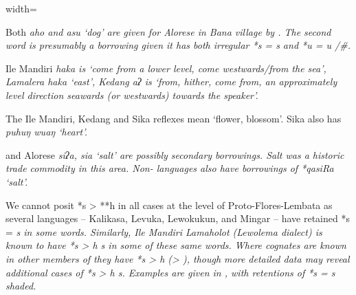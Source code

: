 \begin{table}
\begin{adjustbox}{width=\textwidth}
\begin{threeparttable}
\begin{tablenotes}
			\item[†]	{Both \it{aho}
								and \it{asu} ‘dog’ are given for Alorese in Bana village by \citet{Sulistyono2018}.
								The second word is presumably a borrowing given it has both irregular
								*s = \it{s} and *u = \it{u} /{\gap}{\#}.}
			\item[‡]	{Ile Mandiri \it{haka} is ‘come from a lower level,
								come westwards/from the sea’,
								Lamalera \it{haka} ‘east’,
								Kedang \it{aʔ} is ‘from,
								hither, come from, an approximately level direction seawards
								(or westwards) towards the speaker’.}
			\item[Δ]	{The Ile Mandiri,
								Kedang and Sika reflexes mean ‘flower, blossom’.
								Sika also has \it{puhuŋ wuaŋ} ‘heart’.}
			\item[{ǁ}]	{
								and Alorese \it{siʔa, sia} ‘salt’ are possibly secondary borrowings.
								Salt was a historic trade commodity in this area.
								Non-  languages
								also have borrowings of *qasiRa ‘salt’.}
		\end{tablenotes}
	\end{threeparttable}
\end{adjustbox}
\end{table}

We cannot posit *s > **h in all cases at the level of Proto-Flores-Lembata
as several  languages -- Kalikasa,
Levuka, Lewokukun, and Mingar -- have retained *s = \it{s} in some words.
Similarly, Ile Mandiri Lamaholot (Lewolema dialect) is known
to have *s > \it{h {\tl} s} in some of these same words.
Where cognates are known in other members of 
they have *s > \it{h} (> {\0}),
though more detailed data may reveal additional cases of *s > \it{h {\tl} s}.
Examples are given in ,
with retentions of *s = \it{s} shaded.

